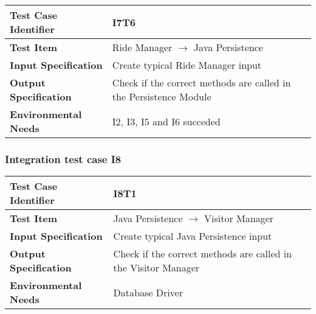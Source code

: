 \begin{table}[!htbp]
\begin{center}
\begin{tabular}[t]{p{}p{}}

\hline
\textbf{Test Case Identifier} & I7T6 \\
\hline
\textbf{Test Item} & Ride Manager $\rightarrow$ Java Persistence \\
\hline
\textbf{Input Specification} & Create typical Ride Manager input \\
\hline
\textbf{Output Specification} & Check if the correct methods are called in the Persistence Module \\
\hline
\textbf{Environmental Needs} & I2, I3, I5 and I6 succeded \\
\hline

\end{tabular}
\end{center}
\end{table}
\clearpage

\subsubsection{Integration test case I8}

\begin{table}[!htbp]
\begin{center}
\begin{tabular}[t]{p{}p{}}

\hline
\textbf{Test Case Identifier} & I8T1 \\
\hline
\textbf{Test Item} & Java Persistence $\rightarrow$ Visitor Manager \\
\hline
\textbf{Input Specification} & Create typical Java Persistence input  \\
\hline
\textbf{Output Specification} & Check if the correct methods are called in the Visitor Manager \\
\hline
\textbf{Environmental Needs} & Database Driver \\
\hline

\end{tabular}
\end{center}
\end{table}

